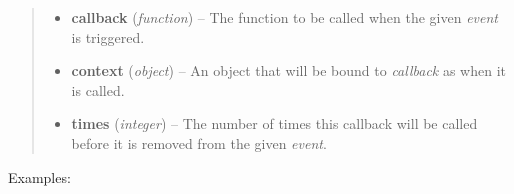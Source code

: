 \documentclass[letterpaper,10pt,openany]{sphinxmanual}
\begin{document}
\begin{fulllineitems}
\begin{fulllineitems}
\begin{fulllineitems}
\begin{quote}
\begin{description}
\begin{itemize}
\item {} 
\textbf{callback} (\emph{function}) -- The function to be called when the given \emph{event} is triggered.

\item {} 
\textbf{context} (\emph{object}) -- An object that will be bound to \emph{callback} as  when it is called.

\item {} 
\textbf{times} (\emph{integer}) -- The number of times this callback will be called before it is removed from the given \emph{event}.

\end{itemize}

\end{description}\end{quote}

Examples:


\end{fulllineitems}
\end{fulllineitems}
\end{fulllineitems}
\end{document}

